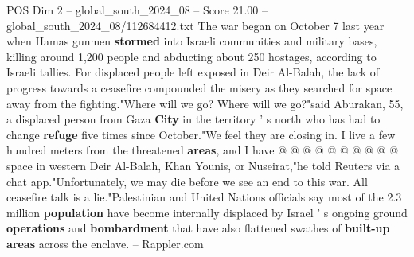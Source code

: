 \begin{textsample}{POS Dim 2 – global\_south\_2024\_08 – Score 21.00 – global\_south\_2024\_08/112684412.txt}
The war began on October 7 last year when Hamas gunmen \textbf{stormed} into Israeli communities and military bases, killing around 1,200 people and abducting about 250 hostages, according to Israeli tallies.
For displaced people left exposed in Deir Al-Balah, the lack of progress towards a ceasefire compounded the misery as they searched for space away from the fighting."Where will we go?
Where will we go?"said Aburakan, 55, a displaced person from Gaza \textbf{City} in the territory ' s north who has had to change \textbf{refuge} five times since October."We feel they are closing in.
I live a few hundred meters from the threatened \textbf{areas}, and I have @ @ @ @ @ @ @ @ @ @ space in western Deir Al-Balah, Khan Younis, or Nuseirat,"he told Reuters via a chat app."Unfortunately, we may die before we see an end to this war.
All ceasefire talk is a lie."Palestinian and United Nations officials say most of the 2.3 million \textbf{population} have become internally displaced by Israel ' s ongoing ground \textbf{operations} and \textbf{bombardment} that have also flattened swathes of \textbf{built-up} \textbf{areas} across the enclave. -- Rappler.com

\end{textsample}
